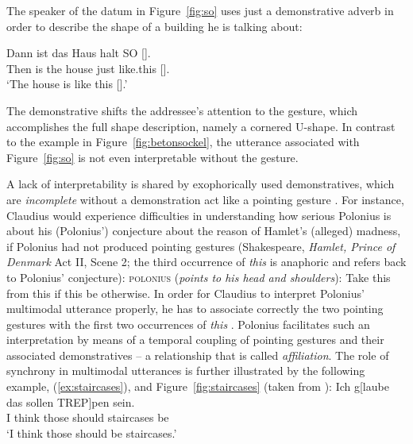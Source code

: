 \documentclass[output=paper,biblatex,babelshorthands,newtxmath,draftmode,colorlinks,citecolor=brown]{langscibook}
\begin{document}
\largerpage[-1]
The speaker of the datum in Figure~\ref{fig:so} uses just a demonstrative adverb in order to describe the shape of a building he is talking about:

\ea \label{ex:so}
\gll Dann ist das Haus halt {SO} {[]}. \\
     Then is the house just like.this {[]}. \\
\glt \enquote*{The house is like this [].} 
\z

\noindent
The demonstrative shifts the addressee's attention to the gesture, which accomplishes the full shape description, namely a cornered U-shape.
%
In contrast to the example in Figure~\ref{fig:betonsockel}, the utterance associated with Figure~\ref{fig:so} is not even interpretable without the gesture.


%
%
A lack of interpretability is shared by exophorically used demonstratives, which are \emph{incomplete} without a demonstration act like a pointing gesture \citep[]{Kaplan:1989:a}.
%
For instance, Claudius would experience difficulties in understanding how serious Polonius is about his (Polonius') conjecture about the reason of Hamlet's (alleged) madness, if Polonius had not produced pointing gestures (Shakespeare, \textit{Hamlet, Prince of Denmark} Act II, Scene 2; the third occurrence of \textit{this} is anaphoric and refers back to Polonius' conjecture):
%
\ea \label{ex:this}
\textsc{polonius} (\textit{points to his head and shoulders}): 
Take this from this if this be otherwise.
\z
%
In order for Claudius to interpret Polonius' multimodal utterance properly, he has to associate correctly the two pointing gestures with the first two occurrences of \textit{this} \citep[cf.][]{Kupffer:2014}. 
%
Polonius facilitates such an interpretation by means of a temporal coupling of pointing gestures and their associated demonstratives -- a relationship that is called \emph{affiliation}.
%
The role of synchrony in multimodal utterances is further illustrated by the following example, (\ref{ex:staircases}), and Figure~\ref{fig:staircases} (taken from \citealp[]{Luecking:2013:a}):
%
\ea \label{ex:staircases}
\gll Ich g[laube das sollen TREP]pen sein.\\
     I think those should staircases be \\
\glt \enquote*{I think those should be staircases.}
\z
\end{document}
